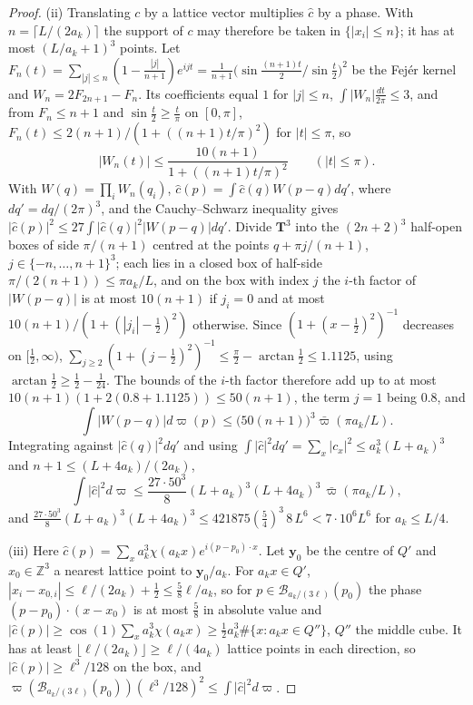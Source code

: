 \documentclass[aps,prd,twocolumn,superscriptaddress,nofootinbib,longbibliography,floatfix,amsmath,amssymb,10pt]{revtex4-2}
\theoremstyle{definition}
\theoremstyle{remark}
\newcommand{\Z}{\mathbb{Z}}
\begin{document}
\begin{proof}
(ii) Translating $c$ by a lattice vector multiplies $\hat c$ by a phase.
With $n=\lceil L/(2a_k)\rceil$ the support of $c$ may therefore be taken in
$\{|x_i|\le n\}$; it has at most $(L/a_k+1)^3$ points. Let $F_n(t)=
\sum_{|j|\le n}(1-\frac{|j|}{n+1})e^{ijt}=\frac1{n+1}\bigl(\sin\frac{(n+1)t}
2/\sin\frac t2\bigr)^2$ be the Fej\'er kernel and $W_n=2F_{2n+1}-F_n$. Its
coefficients equal $1$ for $|j|\le n$, $\int|W_n|\frac{dt}{2\pi}\le3$, and
from $F_n\le n+1$ and $\sin\frac t2\ge\frac t\pi$ on $[0,\pi]$,
$F_n(t)\le2(n+1)/(1+((n+1)t/\pi)^2)$ for $|t|\le\pi$, so
\[
|W_n(t)|\le\frac{10(n+1)}{1+((n+1)t/\pi)^2}\qquad(|t|\le\pi) .
\]
With $W(q)=\prod_iW_n(q_i)$, $\hat c(p)=\int\hat c(q)W(p-q)dq'$, where
$dq'=dq/(2\pi)^3$, and the Cauchy--Schwarz inequality gives $|\hat c(p)|^2
\le27\int|\hat c(q)|^2|W(p-q)|dq'$. Divide $\mathbf T^3$ into the
$(2n+2)^3$ half-open boxes of side $\pi/(n+1)$ centred at the points
$q+\pi j/(n+1)$, $j\in\{-n,\dots,n+1\}^3$; each lies in a closed box of
half-side $\pi/(2(n+1))\le\pi a_k/L$, and on the box with index $j$ the
$i$-th factor of $|W(p-q)|$ is at most $10(n+1)$ if $j_i=0$ and at most
$10(n+1)/(1+(|j_i|-\frac12)^2)$ otherwise. Since $(1+(x-\frac12)^2)^{-1}$
decreases on $[\frac12,\infty)$, $\sum_{j\ge2}(1+(j-\frac12)^2)^{-1}\le
\frac\pi2-\arctan\frac12\le1.1125$, using $\arctan\frac12\ge\frac12-
\frac1{24}$. The bounds of the $i$-th factor therefore add up to at most
$10(n+1)(1+2(0.8+1.1125))\le50(n+1)$, the term $j=1$ being $0.8$, and
\[
\int|W(p-q)|d\varpi(p)\le\bigl(50(n+1)\bigr)^3\bar\varpi(\pi a_k/L).
\]
Integrating against $|\hat c(q)|^2dq'$ and using $\int|\hat c|^2dq'=
\sum_x|c_x|^2\le a_k^3(L+a_k)^3$ and $n+1\le(L+4a_k)/(2a_k)$,
\[
\int|\hat c|^2d\varpi\le\frac{27\cdot50^3}8(L+a_k)^3(L+4a_k)^3\,
\bar\varpi(\pi a_k/L),
\]
and $\frac{27\cdot50^3}8(L+a_k)^3(L+4a_k)^3\le421875(\frac54)^3\,8\,L^6
<7\cdot10^6L^6$ for $a_k\le L/4$.

(iii) Here $\hat c(p)=\sum_xa_k^3\chi(a_kx)e^{i(p-p_0)\cdot x}$. Let
$\mathbf y_0$ be the centre of $Q'$ and $x_0\in\Z^3$ a nearest lattice
point to $\mathbf y_0/a_k$. For $a_kx\in Q'$, $|x_i-x_{0,i}|\le\ell/(2a_k)+
\frac12\le\frac58\ell/a_k$, so for $p\in\mathcal B_{a_k/(3\ell)}(p_0)$ the
phase $(p-p_0)\cdot(x-x_0)$ is at most $\frac58$ in absolute value and
$|\hat c(p)|\ge\cos(1)\sum_xa_k^3\chi(a_kx)\ge\frac12a_k^3\#\{x:a_kx\in
Q''\}$, $Q''$ the middle cube. It has at least $\lfloor\ell/(2a_k)\rfloor\ge
\ell/(4a_k)$ lattice points in each direction, so $|\hat c(p)|\ge
\ell^3/128$ on the box, and $\varpi(\mathcal B_{a_k/(3\ell)}(p_0))
(\ell^3/128)^2\le\int|\hat c|^2d\varpi$.


\end{proof}
\end{document}
